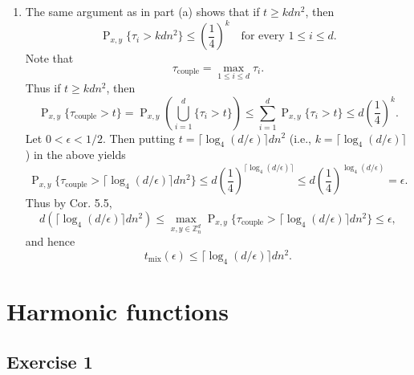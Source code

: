 \documentclass[12pt]{article}
\DeclareMathOperator{\Prob}{P}
\begin{document}
\begin{enumerate}[label=(\alph*)]
\item
The same argument as in part (a) shows that if $t \geq kdn^2$, then
\begin{equation*}
\Prob_{x, y}\{\tau_i > kdn^2\} \leq \left(\frac{1}{4}\right)^k \quad \text{for every $1 \leq i \leq d$}.
\end{equation*}
Note that
\begin{equation*}
\tau_\mathrm{couple} = \max_{1 \leq i \leq d} \tau_i.
\end{equation*}
Thus if $t \geq kdn^2$, then
\begin{equation*}
\Prob_{x, y}\{\tau_\mathrm{couple} > t\} = \Prob_{x, y}\left(\bigcup_{i=1}^d \{\tau_i > t\}\right) \leq \sum_{i=1}^d \Prob_{x, y}\{\tau_i > t\} \leq d\left(\frac{1}{4}\right)^k.
\end{equation*}
Let $0 < \epsilon < 1/2$. Then putting $t = \lceil \log_4(d/\epsilon) \rceil dn^2$ (i.e., $k = \lceil \log_4(d/\epsilon) \rceil$) in the above yields
\begin{equation*}
\Prob_{x, y}\{\tau_\mathrm{couple} > \lceil \log_4(d/\epsilon) \rceil dn^2\} \leq d\left(\frac{1}{4}\right)^{\lceil \log_4(d/\epsilon) \rceil} \leq d\left(\frac{1}{4}\right)^{\log_4(d/\epsilon)} = \epsilon.
\end{equation*}
Thus by Cor. 5.5,
\begin{equation*}
d(\lceil \log_4(d/\epsilon) \rceil dn^2) \leq \max_{x, y \in \mathbb{Z}_n^d} \Prob_{x, y}\{\tau_\mathrm{couple} > \lceil \log_4(d/\epsilon) \rceil dn^2\} \leq \epsilon,
\end{equation*}
and hence
\begin{equation*}
t_\mathrm{mix}(\epsilon) \leq \lceil \log_4(d/\epsilon) \rceil dn^2.
\end{equation*}

\end{enumerate}

\section*{Harmonic functions}

\subsection*{Exercise 1}
\end{document}
